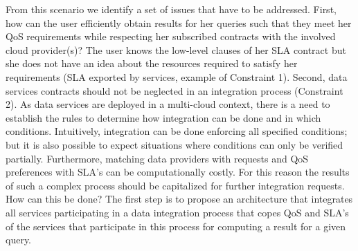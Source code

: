 

  From this scenario we identify a set of issues that have to be addressed. First, how can the user efficiently obtain  results for her queries such that they meet her QoS requirements while respecting her subscribed contracts with the involved cloud provider(s)?  The user knows the low-level clauses of her SLA contract but she does not have an idea about the resources required to satisfy her requirements (SLA exported by services, example of Constraint 1).  Second, data services contracts should not be neglected in an integration process (Constraint 2).   As data services are deployed in a multi-cloud context, there is a need to establish the rules to determine how integration can be done and in which conditions. Intuitively, integration can be  done enforcing all specified conditions; but it is also possible to  expect situations where conditions can only be verified partially. Furthermore,  matching data providers with requests and QoS preferences with SLA's can be computationally costly. For this reason  the results of  such a  complex process  should be capitalized for further integration requests. How can this be done? The first step is to propose an architecture that integrates all services participating in a data integration process that copes QoS and SLA's of the services that participate in this process for computing a result for a given query. 
  
